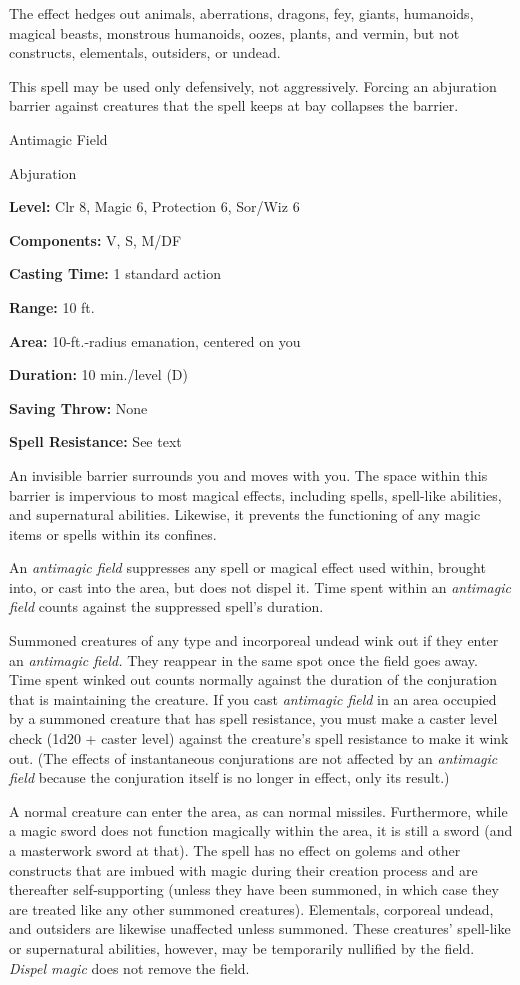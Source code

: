 \documentclass{article}
\begin{document}
The effect hedges out animals, aberrations, dragons, fey, giants, humanoids, magical 
beasts, monstrous humanoids, oozes, plants, and vermin, but not constructs, elementals, 
outsiders, or undead.

This spell may be used only defensively, not aggressively. Forcing an abjuration 
barrier against creatures that the spell keeps at bay collapses the barrier.

\vspace{12pt}
Antimagic Field

Abjuration

\textbf{Level:} Clr 8, Magic 6, Protection 6, Sor/Wiz 6

\textbf{Components:} V, S, M/DF

\textbf{Casting Time:} 1 standard action

\textbf{Range:} 10 ft.

\textbf{Area:} 10-ft.-radius emanation, centered on you

\textbf{Duration:} 10 min./level (D)

\textbf{Saving Throw:} None

\textbf{Spell Resistance:} See text

An invisible barrier surrounds you and moves with you. The space within this barrier 
is impervious to most magical effects, including spells, spell-like abilities, 
and supernatural abilities. Likewise, it prevents the functioning of any magic 
items or spells within its confines.

An \textit{antimagic field }suppresses any spell or magical effect used within, 
brought into, or cast into the area, but does not dispel it. Time spent within 
an \textit{antimagic field }counts against the suppressed spell's duration.

Summoned creatures of any type and incorporeal undead wink out if they enter an 
\textit{antimagic field. }They reappear in the same spot once the field goes away. 
Time spent winked out counts normally against the duration of the conjuration that 
is maintaining the creature. If you cast \textit{antimagic field }in an area occupied 
by a summoned creature that has spell resistance, you must make a caster level 
check (1d20 + caster level) against the creature's spell resistance to make it 
wink out. (The effects of instantaneous conjurations\textit{ }are not affected 
by an \textit{antimagic field }because the conjuration itself is no longer in effect, 
only its result.)

A normal creature can enter the area, as can normal missiles. Furthermore, while 
a magic sword does not function magically within the area, it is still a sword 
(and a masterwork sword at that). The spell has no effect on golems and other constructs 
that are imbued with magic during their creation process and are thereafter self-supporting 
(unless they have been summoned, in which case they are treated like any other 
summoned creatures). Elementals, corporeal undead, and outsiders are likewise unaffected 
unless summoned. These creatures' spell-like or supernatural abilities, however, 
may be temporarily nullified by the field. \textit{Dispel magic }does not remove 
the field.
\end{document}
